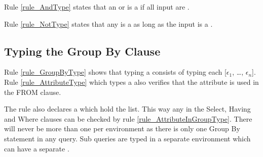 
Rule \ref{rule_AndType} states that an  or  is a  if all input are .

Rule \ref{rule_NotType} states that any  is a  as long as the input is a .

\subsection{Typing the Group By Clause}
Rule \ref{rule_GroupByType} shows that typing a  consists of typing each  [$\epsilon_1$, \mdots, $\epsilon_n$].
Rule \ref{rule_AttributeType} which types a  also verifies that the attribute is used in the FROM clause.

The rule also declares a  which hold the  list.
This way any  in the Select, Having and Where clauses can be checked by rule \ref{rule_AttributeInGroupType}.
There will never be more than one  per environment as there is only one Group By statement in any query. 
Sub queries are typed in a separate environment which can have a separate .

